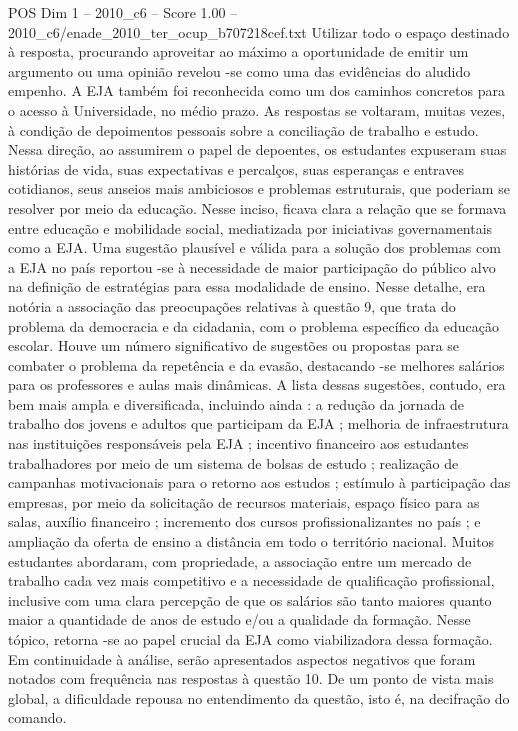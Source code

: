 \begin{textsample}{POS Dim 1 – 2010\_c6 – Score 1.00 – 2010\_c6/enade\_2010\_ter\_ocup\_b707218cef.txt}
Utilizar todo o espaço destinado à resposta, procurando aproveitar ao máximo a oportunidade de emitir um argumento ou uma opinião revelou -se como uma das evidências do aludido empenho.
A EJA também foi reconhecida como um dos caminhos concretos para o acesso à Universidade, no médio prazo.
As respostas se voltaram, muitas vezes, à condição de depoimentos pessoais sobre a conciliação de trabalho e estudo.
Nessa direção, ao assumirem o papel de depoentes, os estudantes expuseram suas histórias de vida, suas expectativas e percalços, suas esperanças e entraves cotidianos, seus anseios mais ambiciosos e problemas estruturais, que poderiam se resolver por meio da educação.
Nesse inciso, ficava clara a relação que se formava entre educação e mobilidade social, mediatizada por iniciativas governamentais como a EJA.
Uma sugestão plausível e válida para a solução dos problemas com a EJA no país reportou -se à necessidade de maior participação do público alvo na definição de estratégias para essa modalidade de ensino.
Nesse detalhe, era notória a associação das preocupações relativas à questão 9, que trata do problema da democracia e da cidadania, com o problema específico da educação escolar.
Houve um número significativo de sugestões ou propostas para se combater o problema da repetência e da evasão, destacando -se melhores salários para os professores e aulas mais dinâmicas.
A lista dessas sugestões, contudo, era bem mais ampla e diversificada, incluindo ainda : a redução da jornada de trabalho dos jovens e adultos que participam da EJA ; melhoria de infraestrutura nas instituições responsáveis pela EJA ; incentivo financeiro aos estudantes trabalhadores por meio de um sistema de bolsas de estudo ; realização de campanhas motivacionais para o retorno aos estudos ; estímulo à participação das empresas, por meio da solicitação de recursos materiais, espaço físico para as salas, auxílio financeiro ; incremento dos cursos profissionalizantes no país ; e ampliação da oferta de ensino a distância em todo o território nacional.
Muitos estudantes abordaram, com propriedade, a associação entre um mercado de trabalho cada vez mais competitivo e a necessidade de qualificação profissional, inclusive com uma clara percepção de que os salários são tanto maiores quanto maior a quantidade de anos de estudo e/ou a qualidade da formação.
Nesse tópico, retorna -se ao papel crucial da EJA como viabilizadora dessa formação.
Em continuidade à análise, serão apresentados aspectos negativos que foram notados com frequência nas respostas à questão 10.
De um ponto de vista mais global, a dificuldade repousa no entendimento da questão, isto é, na decifração do comando.

\end{textsample}
